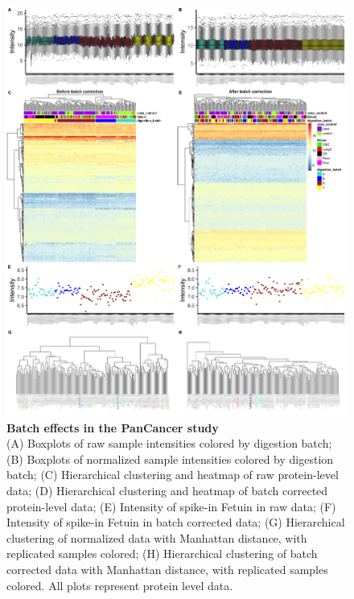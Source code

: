 \documentclass[num-refs]{wiley-article}
\begin{document}
\begin{figure}
	\includegraphics[width=\textwidth]{figures/Supp_Fig2_PanCancer.png}
	
	\caption{\textbf{Batch effects in the PanCancer study} \\
		\footnotesize (A) Boxplots of raw sample intensities colored by digestion batch; (B) Boxplots of normalized sample intensities colored by digestion batch; 
		(C) Hierarchical clustering and heatmap of raw protein-level data; (D) Hierarchical clustering and heatmap of batch corrected protein-level data; (E) Intensity of spike-in Fetuin in raw data; (F) Intensity of spike-in Fetuin in batch corrected data; (G) Hierarchical clustering of normalized data with Manhattan distance, with replicated samples colored; (H) Hierarchical clustering of batch corrected data with Manhattan distance, with replicated samples colored. All plots represent protein level data.}
	\label{fig:batch_figS2_PanCancer}
\end{figure}
\end{document}
